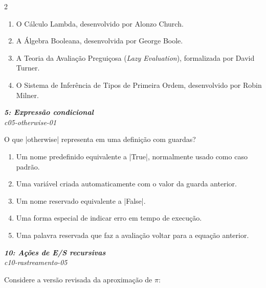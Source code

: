 \documentclass[a4paper,10pt,brazil]{article}
\begin{document}
\begin{multicols}{2}
\begin{enumerate}
  \item O Cálculo Lambda, desenvolvido por Alonzo Church.

  \item A Álgebra Booleana, desenvolvida por George Boole.

  \item A Teoria da Avaliação Preguiçosa (\emph{Lazy Evaluation}), formalizada por David Turner.

  \item O Sistema de Inferência de Tipos de Primeira Ordem, desenvolvido por Robin Milner.


\end{enumerate}

\begin{flushright}
  \footnotesize
  \textit{\textbf{5: Expressão condicional}}\\
  \textit{c05-otherwise-01}\\

\end{flushright}
O que \haskellinline|otherwise| representa em uma definição com guardas?

\begin{enumerate}
  \item Um nome predefinido equivalente a \haskellinline|True|, normalmente usado como caso padrão.

  \item Uma variável criada automaticamente com o valor da guarda anterior.

  \item Um nome reservado equivalente a \haskellinline|False|.

  \item Uma forma especial de indicar erro em tempo de execução.

  \item Uma palavra reservada que faz a avaliação voltar para a equação anterior.


\end{enumerate}

\begin{flushright}
  \footnotesize
  \textit{\textbf{10: Ações de E/S recursivas}}\\
  \textit{c10-rastreamento-05}\\

\end{flushright}
Considere a versão revisada da aproximação de \(\pi\):


\end{multicols}
\end{document}
